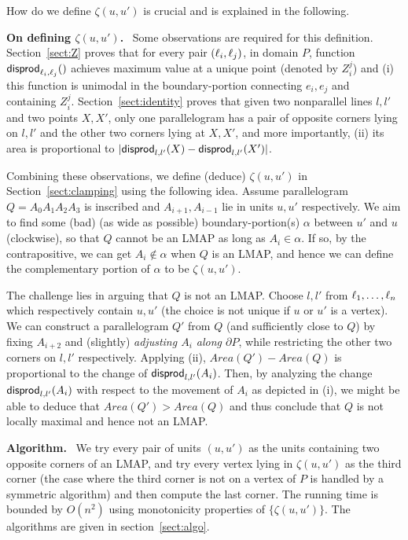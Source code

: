 \documentclass{ws-ijcga}
\begin{document}
How do we define $\zeta(u,u')$ is crucial and is explained in the following.

\medskip \noindent \textbf{On defining $\zeta(u,u')$.}\mbox{  } Some observations are required for this definition.
Section~\ref{sect:Z} proves that for every pair $(\ell_i,\ell_j)$, in domain $P$, function $\mathsf{disprod}_{\ell_i,\ell_j}()$ achieves maximum value at a unique point (denoted by $Z_i^j$) and (i) this function is unimodal in the boundary-portion connecting $e_i,e_j$ and containing $Z_i^j$.
  Section~\ref{sect:identity} proves that given two nonparallel lines $l,l'$ and two points $X,X'$, only one parallelogram has a pair of opposite corners lying on $l,l'$ and the other
    two corners lying at $X,X'$, and more importantly, (ii) its area is proportional to $|\mathsf{disprod}_{l,l'}(X)-\mathsf{disprod}_{l,l'}(X')|$.

\smallskip Combining these observations, we define (deduce) $\zeta(u,u')$ in Section~\ref{sect:clamping} using the following idea.
    Assume parallelogram $Q=A_0A_1A_2A_3$ is inscribed and $A_{i+1},A_{i-1}$ lie in units $u,u'$ respectively.
        We aim to find some (bad) (as wide as possible) boundary-portion(s) $\alpha$ between $u'$ and $u$ (clockwise), so that $Q$ cannot be an LMAP as long as $A_i\in \alpha$.
      If so, by the contrapositive, we can get $A_i\notin \alpha$ when $Q$ is an LMAP, and hence we can define the complementary portion of $\alpha$ to be $\zeta(u,u')$.

    The challenge lies in arguing that $Q$ is not an LMAP.
      Choose $l,l'$ from $\ell_1,\ldots,\ell_n$ which respectively contain $u,u'$ (the choice is not unique if $u$ or $u'$ is a vertex).
    We can construct a parallelogram $Q'$ from $Q$ (and sufficiently close to $Q$) by fixing $A_{i+2}$ and (slightly) \emph{adjusting $A_i$ along $\partial P$},
       while restricting the other two corners on $l,l'$ respectively.
    Applying (ii), $Area(Q')-Area(Q)$ is proportional to the change of $\mathsf{disprod}_{l,l'}(A_{i})$.
    Then, by analyzing the change $\mathsf{disprod}_{l,l'}(A_{i})$ with respect to the movement of $A_i$ as depicted in (i),
      we might be able to deduce that $Area(Q')>Area(Q)$ and thus conclude that $Q$ is not locally maximal and hence not an LMAP.

\newcommand{\block}{\mathsf{block}}
\medskip\noindent\textbf{Algorithm.}\mbox{  }
We try every pair of units $(u,u')$ as the units containing two opposite corners of an LMAP,
  and try every vertex lying in $\zeta(u,u')$ as the third corner (the case where the third corner is not on a vertex of $P$ is handled by a symmetric algorithm) and then compute the last corner.
   The running time is bounded by $O(n^2)$ using monotonicity properties of $\{\zeta(u,u')\}$.
   The algorithms are given in section~\ref{sect:algo}.
\end{document}
